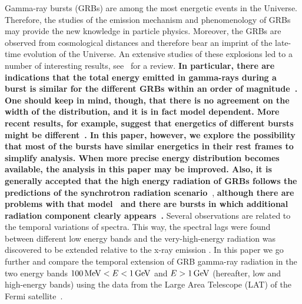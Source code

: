 \documentclass[manuscript]{aastex}
\begin{document}
Gamma-ray bursts (GRBs) are among the most energetic events in the
Universe. Therefore, the studies of the emission mechanism and
phenomenology of GRBs may provide the new knowledge in particle
physics. Moreover, the GRBs are observed from cosmological distances
and therefore bear an imprint of the late-time evolution of the
Universe. An extensive studies of these explosions led to a number of
interesting results, see~\citet{Vianello:2013ela,Gehrels:2013xd} for a
review. {\bf In particular, there are indications that the total
  energy emitted in gamma-rays during a burst is similar for the
  different GRBs within an order of
  magnitude~\citep{postnov1999grb,Bloom:2003wy,Goldstein:2015fib}.
  One should keep in mind, though, that there is no agreement on the
  width of the distribution, and it is in fact model dependent. More
  recent results, for example, suggest that energetics of different
  bursts might be different~\citep{racusin2009jet,
    chandra2012radio}. In this paper, however, we explore the
  possibility that most of the bursts have similar energetics in their
  rest frames to simplify analysis. When more precise energy
  distribution becomes available, the analysis in this paper may be
  improved. {\bf Also, it is generally accepted that} the high energy
  radiation of GRBs follow{\bf s} the predictions of the synchrotron
  radiation scenario~\citep{Wang:2013ptaw}}, {\bf although there are
  problems with that model~\citep{Daigne:2010fb} and there are bursts
  in which additional radiation component clearly
  appears~\citep{Abdo:2009pg}. } Several observations are related to
the temporal variations of spectra. This way, the spectral lags were
found between different low energy bands {\bf
  \citep{cheng1995time,Wu:1999ms} }and the very-high-energy radiation
was discovered to be extended relative to the x-ray emission
\citep{Castignani:2014gaa,Lange:2013uh,Vianello:2013ela}. In this
paper we go further and compare the temporal extension of GRB
gamma-ray radiation in the two energy bands $\unit[100]{MeV} < E <
\unit[1]{GeV}$ and $E > \unit[1]{GeV}$ (hereafter, low and high-energy
bands) using the data from the Large Area Telescope (LAT) of the Fermi
satellite~\citep{2009ApJ...697.1071A,Ackermann:2012kna}.
\end{document}
